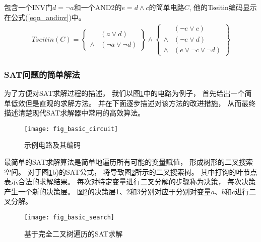 包含一个INV门$d=\neg a$和一个AND2的$e=d\wedge c$的简单电路$C$,
他的Tseitin编码显示在公式(\ref{eqn_andinv})中。
\begin{multline}\label{eqn_andinv}
Tseitin(C)=
\left\{
\begin{array}{cc}
& (a\vee d) \\
\wedge & (\neg a\vee \neg d)
\end{array}
\right\}\wedge\left\{
\begin{array}{cc}
& (\neg e\vee c) \\
\wedge & (\neg e\vee d) \\
\wedge & (e\vee \neg c\vee\neg d)
\end{array}
\right\}
\end{multline}



\subsubsection{SAT问题的简单解法}
为了方便对SAT求解过程的描述，
我们以图\ref{basic_circuit}中的电路为例子，
首先给出一个简单低效但是直观的求解方法。
并在下面逐步描述对该方法的改进措施，
从而最终描述清楚现代SAT求解器中常用的高效算法。

\begin{figure}[t] %
  \centering
  \texttt{[image: fig\_basic\_circuit]}
  \caption{示例电路及其编码}
  \label{basic_circuit}
\end{figure}


最简单的SAT求解算法是简单地遍历所有可能的变量赋值，
形成树形的二叉搜索空间。
对于图\ref{basic_circuit}b)的SAT公式，
将导致图\ref{basic_search}所示的二叉搜索树。
其中打钩的叶节点表示合法的求解结果。
每次对特定变量进行二叉分解的步骤称为决策，
每次决策产生一个新的决策层。
图\ref{basic_search}的决策层1、2和3分别对应于分别对变量$a$、$b$和$c$进行二叉分解。

\begin{figure}[t] %
  \centering
  \texttt{[image: fig\_basic\_search]}
  \caption{基于完全二叉树遍历的SAT求解}
  \label{basic_search}
\end{figure}

